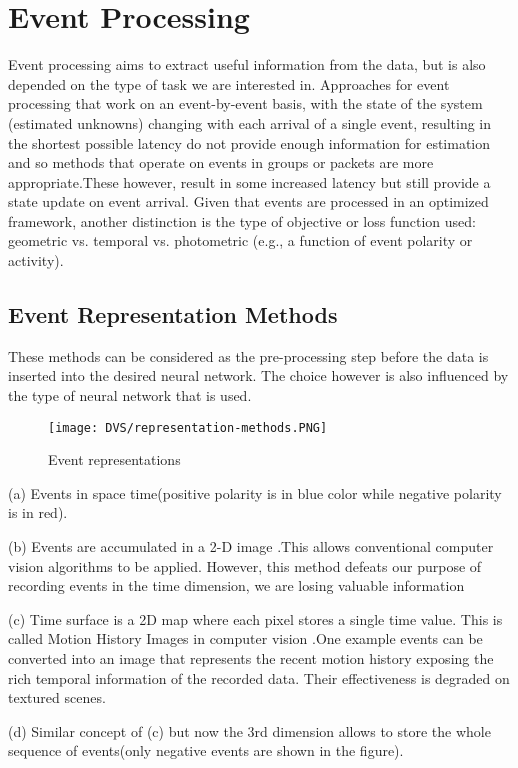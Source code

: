 \documentclass[12pt]{report}
\begin{document}
\section{Event Processing}
Event processing aims to extract useful information from the data, but is also depended on the type of task we are interested in. Approaches for event processing that work on an event-by-event basis, with the state of the system (estimated unknowns) changing with each arrival of a single event, resulting in the shortest possible latency do not provide enough information for estimation and so methods that operate on events in groups or packets are more appropriate.These however, result in some increased latency but still provide a state update on event arrival. Given that events are processed in an optimized framework, another distinction is the type of objective or loss function used: geometric vs. temporal vs. photometric (e.g., a function of event polarity or activity).

\subsection{Event Representation Methods}
These methods can be considered as the pre-processing step before the data is inserted into the desired neural network. The choice however is also influenced by the type of neural network that is used.
\begin{figure}[htp] %
    \centering
     \texttt{[image: DVS/representation-methods.PNG]}
    \caption{Event representations}
    \label{fig:representation-methods}
\end{figure}


(a) Events in space time(positive polarity is in blue color while negative polarity is in red).

(b) Events are accumulated in a 2-D image .This allows conventional computer vision algorithms to be applied. However, this method defeats our purpose of recording events in the time dimension, we are losing valuable information

(c) Time surface is a 2D map where each pixel stores a single time value. This is called Motion History Images in computer vision \cite{ahad2012} .One example \cite{lagorge2017} events can be converted into an image that represents the recent motion history exposing the rich temporal information of the recorded data. Their effectiveness is degraded on textured scenes.

(d) Similar concept of (c) but now the 3rd dimension allows to store the whole sequence of events(only negative events are shown in the figure).
\end{document}
